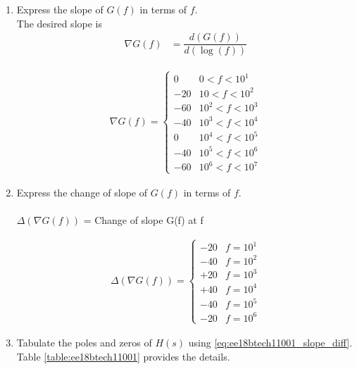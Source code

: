 \begin{enumerate}[label=\thesection.\arabic*.,ref=\thesection.\theenumi]
\item Express the slope of $G(f)$ in terms of $f$.
\\
\solution The desired slope is 
\begin{align}
\nabla G(f) &= \dfrac{d(G(f))}{d(\log(f))}
\end{align}

\begin{align}
 \nabla G(f) = 
 \begin{cases} 
        0 & 0 < f < 10^{1} \\
      -20 & 10 < f < 10^{2} \\
      -60 & 10^{2} < f < 10^{3} \\
      -40 & 10^{3} < f < 10^{4} \\
       0 & 10^{4} < f < 10^{5} \\
      -40 & 10^{5} < f < 10^{6} \\
      -60 & 10^{6} < f < 10^{7}   
 \end{cases}
\end{align}


\item Express the change of slope of $G(f)$ in terms of $f$.
\\
\solution\\
$\Delta(\nabla G(f))$  = Change of slope G(f) at f

\begin{align}
 \Delta(\nabla G(f)) = 
 \begin{cases} 
      -20 &  f = 10^{1} \\
      -40 &  f = 10^{2} \\
      +20 &  f = 10^{3} \\
      +40 &  f = 10^{4} \\
      -40 &  f = 10^{5} \\
      -20 &  f = 10^{6} 
 \end{cases}
\label{eq:ee18btech11001_slope_diff}
\end{align}


\item Tabulate the poles and zeros of $H(s)$ using \eqref{eq:ee18btech11001_slope_diff}.
\\
\solution Table \ref{table:ee18btech11001} provides the details.  
%
\begin{table}[!ht]
\centering

\caption{}
\label{table:ee18btech11001}
\end{table}



\end{enumerate}
